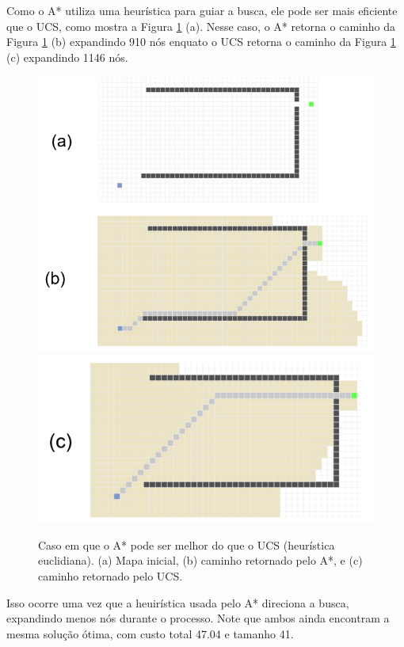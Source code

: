 \documentclass[letterpaper]{article} %
\begin{document}
Como o A* utiliza uma heurística para guiar a busca, ele pode ser mais eficiente
que o UCS, como mostra a Figura \ref{fig:astar_melhor_ucs} (a). Nesse caso, o A*
retorna o caminho da Figura \ref{fig:astar_melhor_ucs} (b) expandindo 910 nós enquato o 
 UCS retorna o caminho da Figura \ref{fig:astar_melhor_ucs} (c) expandindo 1146 nós.
\begin{figure}[htb]
	\centering 
    \caption{Caso em que o A* pode ser melhor do que o UCS (heurística euclidiana). (a) Mapa inicial, 
	(b) caminho retornado pelo A*, e (c)
	caminho retornado pelo UCS.}
	\includegraphics[width=\columnwidth]{images/astar_melhor_ucs_p1.png}
	\includegraphics[width=\columnwidth]{images/astar_melhor_ucs_p2.png}
	\label{fig:astar_melhor_ucs}
\end{figure}

Isso ocorre uma vez que a heuirística usada pelo A* direciona a busca, expandindo menos nós durante o processo.
Note que ambos ainda encontram a mesma solução ótima, com custo total 47.04 e tamanho 41.
\end{document}
